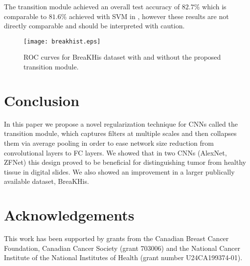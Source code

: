 \documentclass[runningheads,a4paper]{llncs}
\begin{document}
The transition module achieved an overall test accuracy of $82.7\%$ which is comparable to $81.6\%$ achieved with SVM in \cite{Spanhol2016b}, however these results are not directly comparable and should be interpreted with caution.

\begin{figure}[t]
	\centering
	\texttt{[image: breakhist.eps]}
	\caption{ROC curves for BreaKHis \cite{Spanhol2016b} dataset with and without the proposed transition module.}
	\label{fig:breakhist_roc}
\end{figure}


\section{Conclusion}

In this paper we propose a novel regularization technique for CNNs called the transition module, which captures filters at multiple scales and then collapses them via average pooling in order to ease network size reduction from convolutional layers to FC layers. We showed that in two CNNs (AlexNet, ZFNet) this design proved to be beneficial for distinguishing tumor from healthy tissue in digital slides. We also showed an improvement in a larger publically available dataset, BreaKHis. 

\section*{Acknowledgements}
This work has been supported by grants from the Canadian Breast Cancer Foundation, Canadian Cancer Society (grant 703006) and the National Cancer Institute of the National Institutes of Health (grant number U24CA199374-01). 



\end{document}
